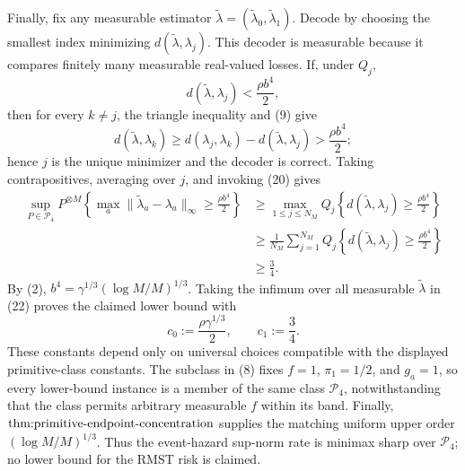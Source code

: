 Finally, fix any measurable estimator \(\widetilde\lambda=(\widetilde\lambda_0,\widetilde\lambda_1)\).  Decode by choosing the smallest index minimizing \(d(\widetilde\lambda,\lambda_j)\).  This decoder is measurable because it compares finitely many measurable real-valued losses.  If, under \(Q_j\),
\[
 d(\widetilde\lambda,\lambda_j)<\frac{\rho b^4}{2},      \tag{21}
\]
then for every \(k\ne j\), the triangle inequality and (9) give
\[
 d(\widetilde\lambda,\lambda_k)
 \ge d(\lambda_j,\lambda_k)-d(\widetilde\lambda,\lambda_j)
 >\frac{\rho b^4}{2};
\]
hence \(j\) is the unique minimizer and the decoder is correct.  Taking contrapositives, averaging over \(j\), and invoking (20) gives
\[
 \begin{split}
 \sup_{P\in\mathcal P_4}P^{\otimes M}\!\left\{
 \max_a\lVert\widetilde\lambda_a-\lambda_a\rVert_\infty
 \ge\frac{\rho b^4}{2}\right\}
 &\ge \max_{1\le j\le N_M}Q_j\!\left\{
 d(\widetilde\lambda,\lambda_j)\ge\frac{\rho b^4}{2}\right\}\\
 &\ge\frac1{N_M}\sum_{j=1}^{N_M}Q_j\!\left\{
 d(\widetilde\lambda,\lambda_j)\ge\frac{\rho b^4}{2}\right\}\\
 &\ge\frac34.                                             \tag{22}
 \end{split}
\]
By (2), \(b^4=\gamma^{1/3}(\log M/M)^{1/3}\).  Taking the infimum over all measurable \(\widetilde\lambda\) in (22) proves the claimed lower bound with
\[
 c_0:=\frac{\rho\gamma^{1/3}}{2},
 \qquad
 c_1:=\frac34.
\]
These constants depend only on universal choices compatible with the displayed primitive-class constants.  The subclass in (8) fixes \(f=1\), \(\pi_1=1/2\), and \(g_a=1\), so every lower-bound instance is a member of the same class \(\mathcal P_4\), notwithstanding that the class permits arbitrary measurable \(f\) within its band.  Finally, \(\textnormal{thm:primitive-endpoint-concentration}\) supplies the matching uniform upper order \((\log M/M)^{1/3}\).  Thus the event-hazard sup-norm rate is minimax sharp over \(\mathcal P_4\); no lower bound for the RMST risk is claimed.
